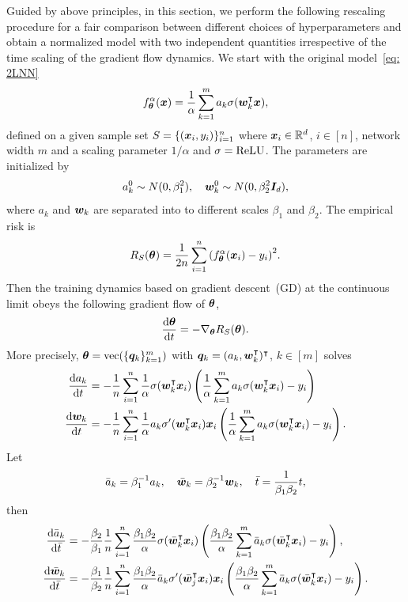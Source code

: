 \documentclass[twoside,11pt]{article}
\begin{document}
Guided by above principles, in this section, we perform the following rescaling procedure for a fair comparison between different choices of hyperparameters and obtain a normalized model with two independent quantities irrespective of the time scaling of the gradient flow dynamics.
We start with the original model~\eqref{eq: 2LNN}
\begin{equation}
    f^{\alpha}_{\bm{\theta}}(\bm{x}) = \frac{1}{\alpha}\sum_{k=1}^{m}a_k\sigma(\bm{w}_k^{\intercal}\bm{x}),
\end{equation}
defined on a given sample set $S=\{(\bm{x}_i,y_i)\}_{i=1}^n$ where $\bm{x}_i\in\mathbb{R}^d$, $i\in[n]$, network width $m$ and a scaling parameter $1/\alpha$ and $\sigma=\mathrm{ReLU}$. The parameters are initialized by
\begin{equation}
    a_k^0\sim N(0, \beta_1^2), \quad \bm{w}_k^0\sim N(0, \beta_2^2 \bm{I}_d),
\end{equation}
where $a_k$ and $\bm{w}_k$ are separated into to different scales $\beta_1$ and $\beta_2$. The empirical risk is
\begin{equation}
    R_S(\bm{\theta})=\frac{1}{2n}\sum_{i=1}^n {(f^{\alpha}_{\bm{\theta}}(\bm{x}_i)-y_i)}^2.
\end{equation}
Then the training dynamics based on gradient descent~(GD) at the continuous limit obeys the following gradient flow of $\bm{\theta}$,
\begin{equation}
    \frac{\mathrm{d} \bm{\theta}}{\mathrm{d} t}=-\nabla_{\bm{\theta}}R_S(\bm{\theta}).
\end{equation}
More precisely, $\bm{\theta}=\mathrm{vec}(\{\bm{q}_k\}_{k=1}^m)$ with $\bm{q}_k=(a_k,\bm{w}_k^{\intercal})^\intercal$, $k\in[m]$ solves
\begin{align*}
    \frac{\mathrm{d} a_k}{\mathrm{d} t}
     & = -\frac{1}{n}\sum_{i=1}^n\frac{1}{\alpha}\sigma(\bm{w}_k^{\intercal}\bm{x}_i) \left(\frac{1}{\alpha}\sum_{k=1}^{m}a_k\sigma(\bm{w}_k^{\intercal}\bm{x}_i)-y_i\right)            \\
    \frac{\mathrm{d} \bm{w}_k}{\mathrm{d} t}
     & = -\frac{1}{n}\sum_{i=1}^n\frac{1}{\alpha} a_k\sigma'(\bm{w}_k^{\intercal}\bm{x}_i)\bm{x}_i \left(\frac{1}{\alpha}\sum_{k=1}^{m}a_k\sigma(\bm{w}_k^{\intercal}\bm{x}_i)-y_i\right).
\end{align*}
Let
\begin{equation}
    \bar{a}_k=\beta_1^{-1}a_k, \quad \bar{\bm{w}}_k=\beta_2^{-1}\bm{w}_k,\quad \bar{t}=\frac{1}{\beta_1\beta_2}t,
\end{equation}
then
\begin{align*}
    \frac{\mathrm{d} \bar{a}_k}{\mathrm{d} \bar{t}}
     & = -\frac{\beta_2}{\beta_1}\frac{1}{n}\sum_{i=1}^n \frac{\beta_1\beta_2}{\alpha}\sigma(\bar{\bm{w}}_k^\intercal\bm{x}_i) \left(\frac{\beta_1\beta_2}{\alpha}\sum_{k=1}^{m}\bar{a}_k\sigma(\bar{\bm{w}}_k^\intercal\bm{x}_i)-y_i\right),               \\
    \frac{\mathrm{d} \bar{\bm{w}}_k}{\mathrm{d} \bar{t}}
     & = -\frac{\beta_1}{\beta_2}\frac{1}{n}\sum_{i=1}^n\frac{\beta_1\beta_2}{\alpha}\bar{a}_k\sigma'(\bar{\bm{w}}_j^\intercal\bm{x}_i)\bm{x}_i \left(\frac{\beta_1\beta_2}{\alpha}\sum_{k=1}^{m}\bar{a}_k\sigma(\bar{\bm{w}}_k^\intercal\bm{x}_i)-y_i\right).
\end{align*}
\end{document}
